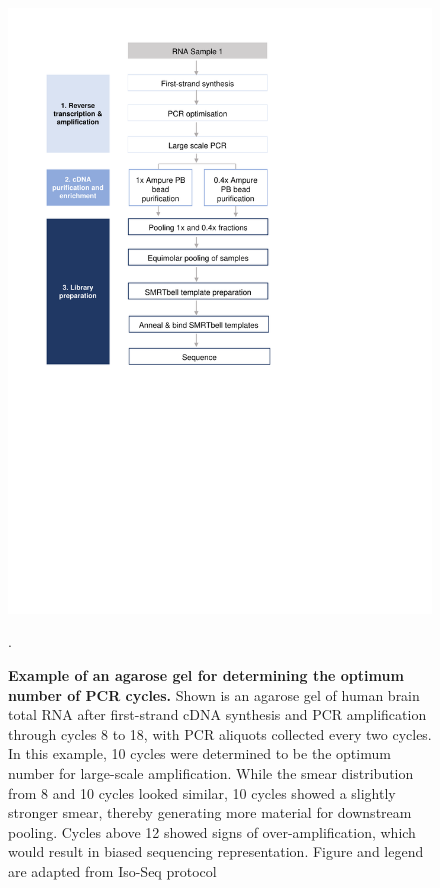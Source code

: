 \begin{figure}[htp]
	\begin{center}
		\includegraphics[page=13,trim={1cm 24cm 10cm 1cm},clip,scale = 0.9]{Figures/ProjectDevelopment_Figures.pdf}
	\end{center}
	\captionsetup{width=0.95\textwidth}
	\caption[Example of an agarose gel for determining the optimum number of PCR cycles]%
	{\textbf{Example of an agarose gel for determining the optimum number of PCR cycles.} Shown is an agarose gel of human brain total RNA after first-strand cDNA synthesis and PCR amplification through cycles 8 to 18, with PCR aliquots collected every two cycles. In this example, 10 cycles were determined to be the optimum number for large-scale amplification. While the smear distribution from 8 and 10 cycles looked similar, 10 cycles showed a slightly stronger smear, thereby generating more material for downstream pooling. Cycles above 12 showed signs of over-amplification, which would result in biased sequencing representation. Figure and legend are adapted from Iso-Seq protocol}.
	\label{fig:pcr_optimisation_gel_eg}
\end{figure}


